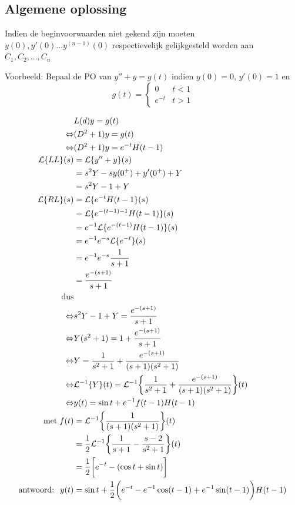 \documentclass[12pt]{report}
\newcommand{\example}[2]{
      \hrulefill
      
      Voorbeeld: #1
      
      #2
      
      \hrulefill
}
\begin{document}
\subsection{Algemene oplossing}
Indien de beginvoorwaarden niet gekend zijn moeten $y(0),y'(0)...y^{(n-1)}(0)$ respectievelijk gelijkgesteld worden aan $C_1, C_2, ..., C_n$

\example{
  Bepaal de PO van $y'' + y = g(t)$ indien $y(0) = 0$, $y'(0) = 1$ en 
  $$
    g(t) = \begin{cases}
	      0 & t < 1 \\
	      e^{-t} & t > 1
	   \end{cases}
  $$
}{
  \begin{equation*}
   \begin{split}
                   & L(d)y = g(t) \\
   \Leftrightarrow & (D^2 + 1)y = g(t) \\
   \Leftrightarrow & (D^2 + 1)y = e^{-t}H(t - 1) \\
   \mathcal{L}\{LL\}(s) & = \mathcal{L}\{y'' + y\}(s) \\
                        & = s^2Y - sy(0^{+}) + y'(0^{+}) + Y \\
                        & = s^2Y - 1 + Y \\
   \mathcal{L}\{RL\}(s) & = \mathcal{L}\{e^{-t}H(t - 1\}(s) \\
                        & = \mathcal{L}\{e^{-(t - 1) - 1}H(t - 1)\}(s) \\
                        & = e^{-1}\mathcal{L}\{e^{-(t - 1)}H(t - 1)\}(s) \\
                        & = e^{-1}e^{-s}\mathcal{L}\{e^{-t}\}(s) \\
                        & = e^{-1}e^{-s}\frac{1}{s + 1} \\
                        & = \frac{e^{-(s + 1)}}{s + 1} \\
   \hbox{dus} \\
   \Leftrightarrow & s^2Y - 1 + Y = \frac{e^{-(s + 1)}}{s + 1} \\
   \Leftrightarrow & Y(s^2 + 1) = 1 + \frac{e^{-(s + 1)}}{s+1} \\
   \Leftrightarrow & Y = \frac{1}{s^2 + 1} + \frac{e^{-(s+1)}}{(s+1)(s^2+1)}     \\
   \Leftrightarrow & \mathcal{L}^{-1}\{Y\}(t) = \mathcal{L}^{-1}\bigg\{\frac{1}{s^2 + 1} + \frac{e^{-(s+1)}}{(s+1)(s^2+1)}\bigg\}(t) \\
   \Leftrightarrow & y(t) = \sin t +e^{-1}f(t - 1)H(t - 1) \\
	   \hbox{met}\; f(t) & = \mathcal{L}^{-1}\bigg\{\frac{1}{(s + 1)(s^2 + 1)}\bigg\}(t) \\
			     & = \frac{1}{2}\mathcal{L}^{-1}\bigg\{\frac{1}{s + 1} - \frac{s - 2}{s^2 + 1}\bigg\}(t) \\
			     & = \frac{1}{2}\bigg[e^{-t} - (\cos t + \sin t)\bigg] \\
	    \hbox{antwoord: }\; y(t)  & = \sin t + \frac{1}{2}\bigg(e^{-t} - e^{-1}\cos (t - 1) + e^{-1} \sin (t - 1) \bigg)H(t - 1)
   \end{split}
  \end{equation*}

}
\end{document}
